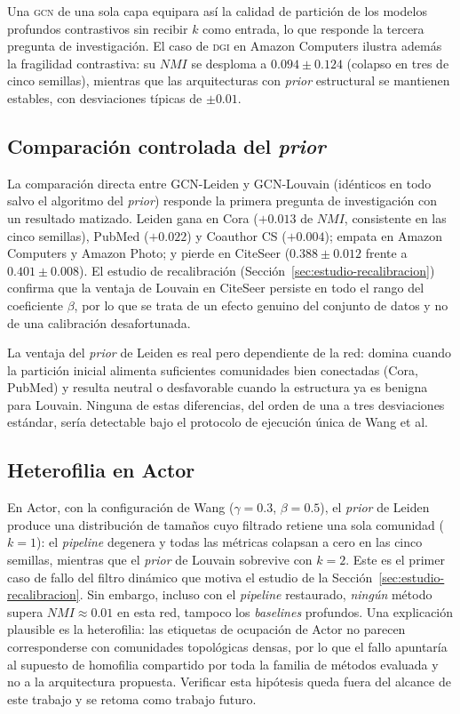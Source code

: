 \documentclass[twoside,twocolumn,10pt]{article}
\begin{document}
Una \textsc{gcn} de una sola capa equipara así la calidad de partición de los modelos profundos contrastivos sin recibir $k$ como entrada, lo que responde la tercera pregunta de investigación. El caso de \textsc{dgi} en Amazon Computers ilustra además la fragilidad contrastiva: su $NMI$ se desploma a $0.094 \pm 0.124$ (colapso en tres de cinco semillas), mientras que las arquitecturas con \textit{prior} estructural se mantienen estables, con desviaciones típicas de $\pm 0.01$.

\subsection{Comparación controlada del \textit{prior}}
\label{subsec:analisis-ablacion-prior}

La comparación directa entre GCN-Leiden y GCN-Louvain (idénticos en todo salvo el algoritmo del \textit{prior}) responde la primera pregunta de investigación con un resultado matizado. Leiden gana en Cora ($+0.013$ de $NMI$, consistente en las cinco semillas), PubMed ($+0.022$) y Coauthor CS ($+0.004$); empata en Amazon Computers y Amazon Photo; y pierde en CiteSeer ($0.388 \pm 0.012$ frente a $0.401 \pm 0.008$). El estudio de recalibración (Sección~\ref{sec:estudio-recalibracion}) confirma que la ventaja de Louvain en CiteSeer persiste en todo el rango del coeficiente $\beta$, por lo que se trata de un efecto genuino del conjunto de datos y no de una calibración desafortunada.

La ventaja del \textit{prior} de Leiden es real pero dependiente de la red: domina cuando la partición inicial alimenta suficientes comunidades bien conectadas (Cora, PubMed) y resulta neutral o desfavorable cuando la estructura ya es benigna para Louvain. Ninguna de estas diferencias, del orden de una a tres desviaciones estándar, sería detectable bajo el protocolo de ejecución única de Wang et al.

\subsection{Heterofilia en Actor}
\label{subsec:analisis-film}

En Actor, con la configuración de Wang ($\gamma=0.3$, $\beta=0.5$), el \textit{prior} de Leiden produce una distribución de tamaños cuyo filtrado retiene una sola comunidad ($k=1$): el \textit{pipeline} degenera y todas las métricas colapsan a cero en las cinco semillas, mientras que el \textit{prior} de Louvain sobrevive con $k=2$. Este es el primer caso de fallo del filtro dinámico que motiva el estudio de la Sección~\ref{sec:estudio-recalibracion}. Sin embargo, incluso con el \textit{pipeline} restaurado, \emph{ningún} método supera $NMI \approx 0.01$ en esta red, tampoco los \textit{baselines} profundos. Una explicación plausible es la heterofilia: las etiquetas de ocupación de Actor no parecen corresponderse con comunidades topológicas densas, por lo que el fallo apuntaría al supuesto de homofilia compartido por toda la familia de métodos evaluada y no a la arquitectura propuesta. Verificar esta hipótesis queda fuera del alcance de este trabajo y se retoma como trabajo futuro.
\end{document}

